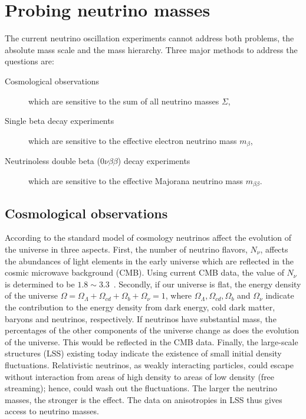 \section{Probing neutrino masses}
\label{sec:pnm}
The current neutrino oscillation experiments cannot address both problems, the absolute mass scale and the mass hierarchy. Three major methods to address the questions are:
\begin{description}
\item[Cosmological observations] which are sensitive to the sum of all neutrino masses $\Sigma$,
\item[Single beta decay experiments] which are sensitive to the   effective electron neutrino mass $m_{\beta}$,
\item[Neutrinoless double beta ($0\nu\beta\beta$) decay experiments] which are sensitive   to the effective Majorana neutrino mass $m_{\beta\beta}$.
\end{description}

\subsection{Cosmological observations}
\label{sec:coob}
According to the standard model of cosmology neutrinos affect the evolution of the universe in three aspects. First, the number of neutrino flavors, $N_{\nu}$, affects the abundances of light elements in the early universe which are reflected in the cosmic microwave background (CMB). Using current CMB data, the value of $N_{\nu}$ is determined to be $1.8 \sim 3.3$~\cite{Oli02}. Secondly, if our universe is flat, the energy density of the universe $\Omega = \Omega_{\Lambda} + \Omega_{cd} + \Omega_{b} + \Omega_{\nu} = 1$, where $\Omega_{\Lambda}, \Omega_{cd}, \Omega_{b}$ and $\Omega_{\nu}$ indicate the contribution to the energy density from dark energy, cold dark matter, baryons and neutrinos, respectively. If neutrinos have substantial mass, the percentages of the other components of the universe change as does the evolution of the universe. This would be reflected in the CMB data. Finally, the large-scale structures (LSS) existing today indicate the existence of small initial density fluctuations. Relativistic neutrinos, as weakly interacting particles, could escape without interaction from areas of high density to areas of low density (free streaming); hence, could wash out the  fluctuations. The larger the neutrino masses, the stronger is the effect. The data on anisotropies in LSS thus gives access to neutrino masses. 

